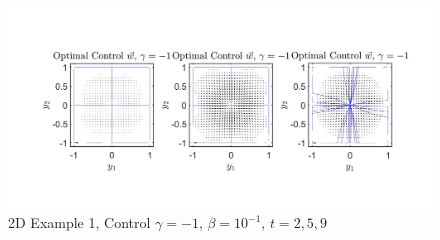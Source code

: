 \documentclass[11pt, a4paper]{article}
\theoremstyle{definition}
\begin{document}
	\begin{figure}[h]
		\includegraphics[scale=0.25]{FigC4.jpg}
		\caption{2D Example 1, Control $\gamma = -1$, $\beta = 10^{-1}$, $t = 2,5,9$}
		\label{Control4}
	\end{figure}
	
	
	
\end{document}
